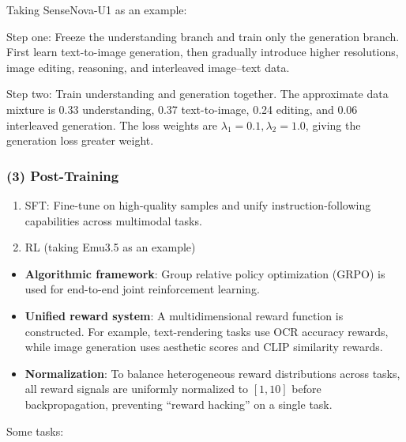 Taking SenseNova-U1 as an example:

Step one: Freeze the understanding branch and train only the generation branch. First learn text-to-image generation, then gradually introduce higher resolutions, image editing, reasoning, and interleaved image--text data.

Step two: Train understanding and generation together. The approximate data mixture is 0.33 understanding, 0.37 text-to-image, 0.24 editing, and 0.06 interleaved generation. The loss weights are \(\lambda_1=0.1,\lambda_2=1.0\), giving the generation loss greater weight.

\hypertarget{post-training-1}{%
\subsubsection{(3) Post-Training}\label{post-training-1}}

\begin{enumerate}
\def\labelenumi{\arabic{enumi}.}
\item
  SFT: Fine-tune on high-quality samples and unify instruction-following capabilities across multimodal tasks.
\item
  RL (taking Emu3.5 as an example)
\end{enumerate}

\begin{itemize}
\tightlist
\item
  \textbf{Algorithmic framework}: Group relative policy optimization (GRPO) is used for end-to-end joint reinforcement learning.
\item
  \textbf{Unified reward system}: A multidimensional reward function is constructed. For example, text-rendering tasks use OCR accuracy rewards, while image generation uses aesthetic scores and CLIP similarity rewards.
\item
  \textbf{Normalization}: To balance heterogeneous reward distributions across tasks, all reward signals are uniformly normalized to \([1,10]\) before backpropagation, preventing ``reward hacking'' on a single task.
\end{itemize}

Some tasks:

